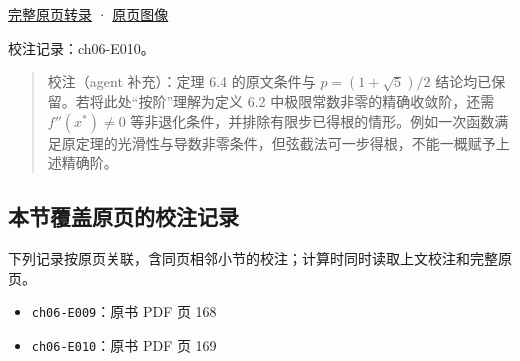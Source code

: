 \documentclass[
  10pt,
  fontset=fandol]{ctexart}
\providecommand{\tightlist}{%
  \setlength{\itemsep}{0pt}\setlength{\parskip}{0pt}}
\begin{document}
\href{../pages/pdf-169.md}{完整原页转录} · \href{../../source-images/pdf-169.jpeg}{原页图像}

校注记录：ch06-E010。

\begin{quote}
校注（agent 补充）：定理 6.4 的原文条件与 \(p=(1+\sqrt5)/2\) 结论均已保留。若将此处``按阶''理解为定义 6.2 中极限常数非零的精确收敛阶，还需 \(f''(x^*)\ne0\) 等非退化条件，并排除有限步已得根的情形。例如一次函数满足原定理的光滑性与导数非零条件，但弦截法可一步得根，不能一概赋予上述精确阶。
\end{quote}

\subsection{本节覆盖原页的校注记录}\label{ux672cux8282ux8986ux76d6ux539fux9875ux7684ux6821ux6ce8ux8bb0ux5f55}

下列记录按原页关联，含同页相邻小节的校注；计算时同时读取上文校注和完整原页。

\begin{itemize}
\tightlist
\item
  \texttt{ch06-E009}：原书 PDF 页 168
\item
  \texttt{ch06-E010}：原书 PDF 页 169
\end{itemize}
\end{document}
